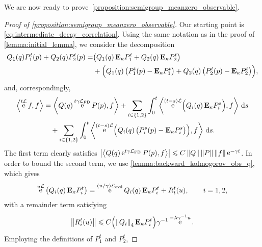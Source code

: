 \documentclass[11pt,a4paper]{article}
\DeclareMathOperator{\e}{e}
\newcommand{\expect}[0]{\mathbf{E}}
\renewcommand{\d}{\mathrm d}
\theoremstyle{plain}
\numberwithin{equation}{section}
\renewcommand{\leq}{\leqslant}
\begin{document}
We are now ready to prove~\cref{proposition:semigroup_meanzero_observable}.
\begin{proof}
    [Proof of \cref{proposition:semigroup_meanzero_observable}]
    Our starting point is \eqref{eq:intermediate_decay_correlation}.
    Using the same notation as in the proof of \cref{lemma:initial_lemma},
    we consider the decomposition
    \begin{align}
        \notag
        Q_1(q) P^t_1(p) + Q_2(q) P^t_2(p)
        =& \big( Q_1(q) \, \expect_\kappa P^t_1 + Q_2(q) \, \expect_\kappa P^t_2 \big) \\
        \label{eq:decomposition}
         &+ \Bigl( Q_1(q) \, \bigl(P^t_1(p) - \expect_\kappa P^t_1\bigr) + Q_2(q) \, \bigl(P^t_2(p) - \expect_\kappa P^t_2\bigr) \Bigr),
    \end{align}
    and, correspondingly,
    \begin{align}
        \notag
        \ip{\e^{t \mathcal L} f}{f}
        &= \ip{Q(q) \e^{t \gamma \mathcal L_{\rm FD}} P(p)}{f}
        + \sum_{i\in\{1,2\}} \int_{0}^t \ip{\e^{(t-s) \mathcal L} \Bigl( Q_i(q) \, \expect_\kappa P^s_i \Bigr)}{f} \, \d s\\
        \label{eq:intermediate_decay_correlation_2}
        &\quad + \sum_{i\in\{1,2\}} \int_{0}^t \ip{\e^{(t-s) \mathcal L} \Bigl( Q_i(q) \, \bigl(P^s_i(p) - \expect_\kappa P^s_i \bigr) \Bigr)}{f} \, \d s.
    \end{align}
    The first term clearly satisfies $\abs{ \ip{Q(q) \e^{t \gamma \mathcal L_{\rm FD}} P(p)}{f} } \leq C \norm{Q} \norm{P} \norm{f} \e^{-\gamma t}$.
    In order to bound the second term, we use \cref{lemma:backward_kolmogorov_obs_q},
    which gives
    \begin{equation}
        \label{eq:semigroup_on_q_part}
        \e^{u \mathcal L} \big( Q_i(q) \, \expect_\kappa P^t_i \bigr)
        =  \e^{(u/\gamma) \mathcal L_{\rm ovd}} Q_i(q) \, \expect_\kappa P^t_i + R_t^t(u),
        \qquad i = 1, 2,
    \end{equation}
    with a remainder term satisfying
    \begin{equation}
        \label{eq:bound_remainder}
        \norm{R_i^t(u)} \leq C \Bigl( \norm{Q_i}_4 \expect_\kappa P^t_i \Bigr) \gamma^{-1} \e^{-\lambda \gamma^{-1} u}.
    \end{equation}
    Employing the definitions of $P^t_1$ and $P^t_2$,

\end{proof}
\end{document}
